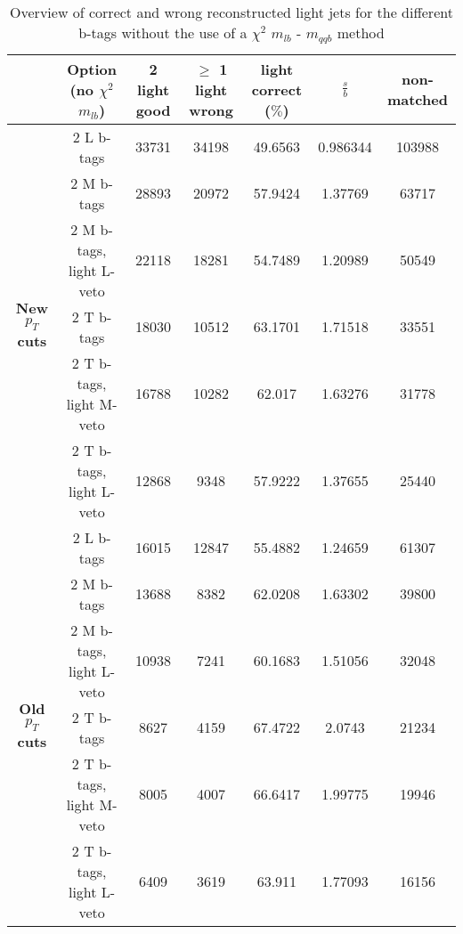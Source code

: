 \documentclass[a4paper,12pt]{report}
\begin{document}
\begin{landscape}
\begin{table}[!h] 
\begin{tabular}{c|c|c|c|c|c|c} 
&\textbf{Option} (no $\chi^{2}$ $m_{lb}$) & 2 light good  & $\geq$ 1 light wrong & light correct ($\%$) & $\frac{s}{b}$ & non-matched \\ \hline 
\multirow{6}{*}{\textbf{New $p_T$ cuts}} 
& 2 L b-tags              & 33731 & 34198 & 49.6563 & 0.986344 & 103988  \\ 
& 2 M b-tags              & 28893 & 20972 & 57.9424 & 1.37769 & 63717  \\ 
& 2 M b-tags, light L-veto & 22118 & 18281 & 54.7489 & 1.20989 & 50549  \\ 
& 2 T b-tags              & 18030 & 10512 & 63.1701 & 1.71518 & 33551  \\ 
& 2 T b-tags, light M-veto & 16788 & 10282 & 62.017 & 1.63276 & 31778  \\ 
& 2 T b-tags, light L-veto & 12868 & 9348 & 57.9222 & 1.37655 & 25440  \\ 
\hline
\multirow{6}{*}{\textbf{Old $p_T$ cuts}} 
& 2 L b-tags              & 16015 & 12847 & 55.4882 & 1.24659 & 61307  \\ 
& 2 M b-tags              & 13688 & 8382 & 62.0208 & 1.63302 & 39800  \\ 
& 2 M b-tags, light L-veto & 10938 & 7241 & 60.1683 & 1.51056 & 32048  \\ 
& 2 T b-tags              & 8627 & 4159 & 67.4722 & 2.0743 & 21234  \\ 
& 2 T b-tags, light M-veto & 8005 & 4007 & 66.6417 & 1.99775 & 19946  \\ 
& 2 T b-tags, light L-veto & 6409 & 3619 & 63.911 & 1.77093 & 16156  \\ 
 \end{tabular} 
\caption{Overview of correct and wrong reconstructed light jets for the different b-tags without the use of a $\chi^{2}$ $m_{lb}$ - $m_{qqb}$ method} 
 \end{table}


\end{landscape}
\end{document}
